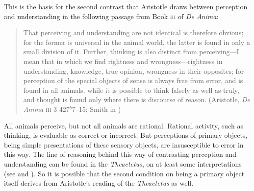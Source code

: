 This is the basis for the second contrast that Aristotle draws between perception and understanding in the following passage from Book \textsc{iii} of \emph{De Anima}:
\begin{quote}
	That perceiving and understanding are not identical is therefore obvious; for the former is universal in the animal world, the latter is found in only a small division of it. Further, thinking is also distinct from perceiving---I mean that in which we find rightness and wrongness---right\-ness in understanding, knowledge, true opinion, wrongness in their opposites; for perception of the special objects of sense is always free from error, and is found in all animals, while it is possible to think falsely as well as truly, and thought is found only where there is discourse of reason. (Aristotle, \emph{De Anima} \textsc{iii} 3 427\( ^{b} \)7--15; Smith in \citealt[49]{Barnes:1984uq})
\end{quote}
All animals perceive, but not all animals are rational. Rational activity, such as thinking, is evaluable as correct or incorrect. But perceptions of primary objects, being simple presentations of these sensory objects, are insusceptible to error in this way. The line of reasoning behind this way of contrasting perception and understanding can be found in the \emph{Theaetetus}, on at least some interpretations (see \citealt{Cooper:1970kx} and \citealt{Burnyeat:1990dp}). So it is possible that the second condition on being a primary object itself derives from Aristotle's reading of the \emph{Theaetetus} as well.


